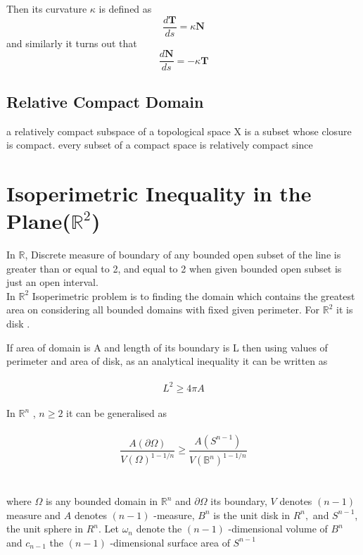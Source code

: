 \documentclass[oneside]{book}
\begin{document}
  Then its curvature $\kappa$ is defined as
  \begin{equation}
  \label{eq3}  
    \frac{d \mathbf{T}}{d s}=\kappa \mathbf{N}
\end{equation}  and similarly it turns out that \begin{equation}
\label{eq4}  
    \frac{d \mathbf{N}}{d s}=-\kappa \mathbf{T}
\end{equation}

\subsection{Relative Compact Domain} \label{ss:2}
a relatively compact subspace of a topological space X is a subset whose closure is compact.
every subset of a compact space is relatively compact since
    \







\section{\textbf{Isoperimetric Inequality in the Plane($\mathbb{R}^{2}$)}}
\label{s:3}
 In $\mathbb{R}$, Discrete measure of boundary of any bounded open subset of the line is greater than or equal to 2, and equal to 2 when given bounded open subset is just an open interval.\\
  In $\mathbb{R}^{2}$ Isoperimetric problem is to finding the domain which contains the greatest area on considering  all bounded domains with fixed given perimeter. For $\mathbb{R}^{2}$ it is disk . 

    If area of domain is A and length of its boundary is L then using values of perimeter and area of disk,
    as an analytical inequality it can be written as \\\\
    \begin{equation}
    \label{eq5}  
    L^{2} \geq 4 \pi A
        \end{equation}
      \\
        In $\mathbb{R}^{n}$ 
        , $n \geq 2$  it can be generalised as
        \\\\
       \begin{equation}
       \label{eq6}  
             \frac{A(\partial \Omega)}{V(\Omega)^{1-1 / n}} \geq \frac{A\left(S^{n-1}\right)}{V\left(\mathbb{B}^{n}\right)^{1-1 / n}}
          \end{equation} \\\\
        where $\Omega$ is any bounded domain in $\mathbb{R}^{n}$ and $\partial \Omega$ its boundary, $V$ denotes $(n-1)$
measure and $A$ denotes $(n-1)$ -measure, $B^{n}$ is the unit disk in $R^{n},$ and $S^{n-1}$,
the unit sphere in $R^{n}$.
Let $\omega_{n}$ denote the $(n-1)$ -dimensional volume of $B^{n}$ and  $c_{n-1}$ the $(n-1)$ -dimensional surface area of $S^{n-1}$ \\\\
\end{document}
